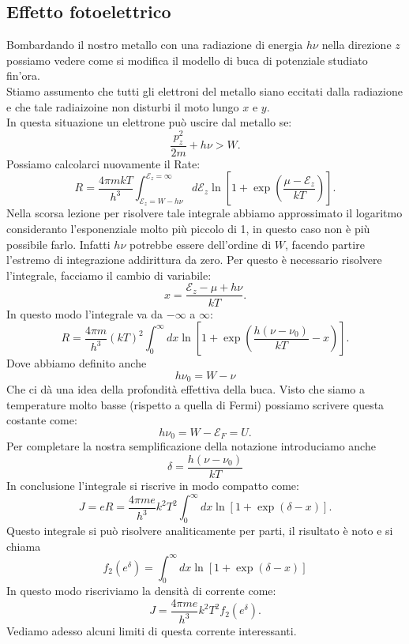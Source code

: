 \subsection{Effetto fotoelettrico}%
Bombardando il nostro metallo con una radiazione di energia $h \nu $ nella direzione $z$ possiamo vedere come si modifica il modello di buca di potenziale studiato fin'ora. \\
Stiamo assumento che tutti gli elettroni del metallo siano eccitati dalla radiazione e che tale radiaizoine non disturbi il moto lungo $x$ e $y$. \\
In questa situazione un elettrone può uscire dal metallo se:
\[
	\frac{p_{z}^2}{2m} + h\nu > W
.\] 
Possiamo calcolarci nuovamente il Rate:
\[
	R = \frac{4\pi m kT}{h^3}\int_{\mathcal{E} _{z} = W - h\nu }^{\mathcal{E}_{z}=\infty} d\mathcal{E} _{z} \ln\left[ 1 +\exp\left( \frac{\mu -\mathcal{E} _{z}}{kT} \right)  \right] 
.\] 
Nella scorsa lezione per risolvere tale integrale abbiamo approssimato il logaritmo consideranto l'esponenziale molto più piccolo di 1, in questo caso non è più possibile farlo. Infatti $h\nu $ potrebbe essere dell'ordine di $W$, facendo partire l'estremo di integrazione addirittura da zero. Per questo è necessario risolvere l'integrale, facciamo il cambio di variabile:
\[
	x = \frac{\mathcal{E} _{z}- \mu + h\nu }{kT}
.\] 
In questo modo l'integrale va da $-\infty$ a $\infty$:
\[
	R = \frac{4\pi m }{h^3} \left( kT \right) ^2 \int_{0}^{\infty} dx \ln\left[ 1+\exp\left( \frac{h\left( \nu -\nu_0 \right) }{kT} - x \right)  \right]  
.\] 
Dove abbiamo definito anche 
\[
	h\nu_0=W-\nu 
\]
Che ci dà una idea della profondità effettiva della buca. Visto che siamo a temperature molto basse (rispetto a quella di Fermi) possiamo scrivere questa costante come:
\[
	h\nu_0 = W - \mathcal{E}_{F} = U
.\] 
Per completare la nostra semplificazione della notazione introduciamo anche
\[
	\delta = \frac{h\left( \nu -\nu_0 \right) }{kT}
\]
In conclusione l'integrale si riscrive in modo compatto come:
\[
	J = eR = \frac{4\pi m e}{h^3} k^2T^2 \int_{0}^{\infty} dx \ln\left[ 1 + \exp\left( \delta -x \right)  \right]  
.\] 
Questo integrale si può risolvere analiticamente per parti, il risultato è noto e si chiama
\[
	f_{2}(e^{\delta}) = \int_{0}^{\infty} dx \ln\left[ 1 + \exp\left( \delta - x \right)  \right]  
\]
In questo modo riscriviamo la densità di corrente come:
\[
	J =  \frac{4\pi m e}{h^3} k^2T^2 f_2(e^{\delta }) 
.\] 
Vediamo adesso alcuni limiti di questa corrente interessanti.
